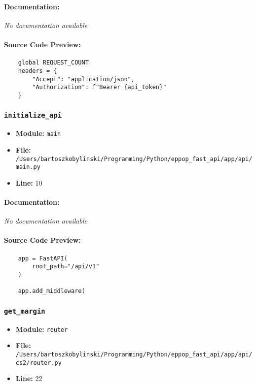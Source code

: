 \documentclass[11pt,a4paper]{article}
\begin{document}
\paragraph{Documentation:} \textit{No documentation available}

\paragraph{Source Code Preview:}
\begin{verbatim}
    global REQUEST_COUNT
    headers = {
        "Accept": "application/json",
        "Authorization": f"Bearer {api_token}"
    }
\end{verbatim}

\vspace{1em}
\subsubsection{\texttt{initialize\_api}}

\begin{itemize}
    \item \textbf{Module:} \texttt{main}
    \item \textbf{File:} \texttt{/Users/bartoszkobylinski/Programming/Python/eppop\_fast\_api/app/api/main.py}
    \item \textbf{Line:} 10
\end{itemize}

\paragraph{Documentation:} \textit{No documentation available}

\paragraph{Source Code Preview:}
\begin{verbatim}
    app = FastAPI(
        root_path="/api/v1"
    )

    app.add_middleware(
\end{verbatim}

\vspace{1em}
\subsubsection{\texttt{get\_margin}}

\begin{itemize}
    \item \textbf{Module:} \texttt{router}
    \item \textbf{File:} \texttt{/Users/bartoszkobylinski/Programming/Python/eppop\_fast\_api/app/api/cs2/router.py}
    \item \textbf{Line:} 22
\end{itemize}
\end{document}
